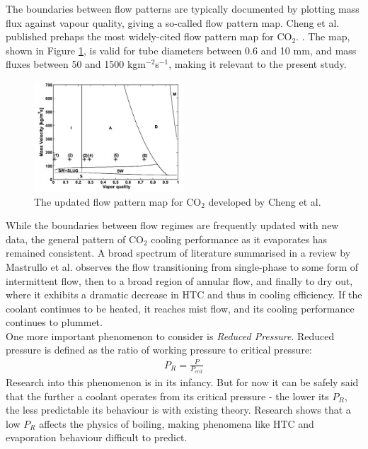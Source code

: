 \documentclass{report}
\begin{document}
\FloatBarrier
The boundaries between flow patterns are typically documented by plotting mass flux against vapour quality, giving a so-called flow pattern map. Cheng et al. published prehaps the most widely-cited flow pattern map for CO$_2$. \cite{Cheng 2008}. The map, shown in Figure \ref{fig:chengMap}, is valid for tube diameters between 0.6 and 10 mm, and mass fluxes between 50 and 1500 kgm$^{-2}$s$^{-1}$, making it relevant to the present study.\\
\FloatBarrier
\begin{figure}
\includegraphics[width=0.5\textwidth]{chengMap}
\caption{The updated flow pattern map for CO$_2$ developed by Cheng et al. \cite{Cheng 2008}}
\label{fig:chengMap}
\end{figure}
\FloatBarrier
While the boundaries between flow regimes are frequently updated with new data, the general pattern of CO$_2$ cooling performance as it evaporates has remained consistent. A broad spectrum of literature summarised in a review by Mastrullo et al.\cite{Mastrullo 2010} observes the flow transitioning from single-phase to some form of intermittent flow, then to a broad region of annular flow, and finally to dry out, where it exhibits a dramatic decrease in HTC and thus in cooling efficiency. If the coolant continues to be heated, it reaches mist flow, and its cooling performance continues to plummet. 
\\
One more important phenomenon to consider is \textit{Reduced Pressure}. Reduced pressure is defined as the ratio of working pressure to critical pressure:
\begin{eqnarray}
P_R=\frac{P}{P_{crit}}
\end{eqnarray}
Research into this phenomenon is in its infancy. But for now it can be safely said that the further a coolant operates from its critical pressure - the lower its $P_R$, the less predictable its behaviour is with existing theory. \cite{Mastrullo 2012}\cite{Mastrullo 2012b} Research shows that a low $P_R$ affects the physics of boiling, making phenomena like HTC and evaporation behaviour difficult to predict.
\FloatBarrier
\end{document}
